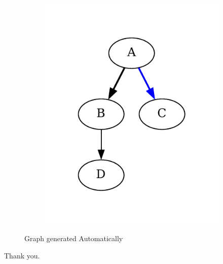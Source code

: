 \documentclass{article}
\begin{document}
\begin{figure}[htbp]
\begin{subfigure}{0.45\textwidth}
  \includegraphics[width=.9\linewidth]{./graph-2.pdf}
\end{subfigure}
\caption{Graph generated Automatically}
\end{figure}

Thank you.
\end{document}
